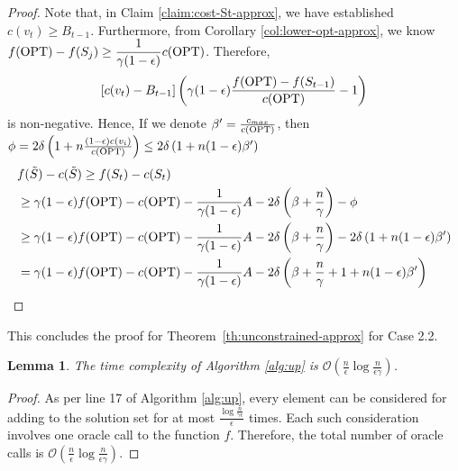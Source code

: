 \documentclass[10pt]{article} %
\newtheorem{lemma}[theorem]{Lemma}
\theoremstyle{remark}
\newcommand{\OPT}{{\rm OPT}}
\begin{document}
\begin{proof}
Note that, in Claim \ref{claim:cost-St-approx}, we have established $c(v_t)\geq B_{t-1}$. Furthermore, from Corollary \ref{col:lower-opt-approx}, we know
$f(\OPT) - f(S_j) \geq \displaystyle\frac{1}{\gamma(1-\epsilon)}{c(\OPT)}$. Therefore, 
\[
[c(v_t)-B_{t-1}]\left( \gamma(1-\epsilon) \displaystyle\frac{f(\OPT) - f(S_{t-1})}{c(\OPT)} -1 \right)
\]
is non-negative. Hence, 
If we denote $\beta' = \frac{c_{max}}{c(\OPT)}$, then $\phi = 2\delta  \left( 1+n\frac{(1-\epsilon)c(v_i)}{ c(\OPT)} \right) \leq 2\delta  \left( 1+n(1-\epsilon)\beta' \right)$
\begin{align*}
   &f(\Tilde{S})-c(\Tilde{S}) \geq f(S_t)-c(S_t)\\
   &\geq \gamma(1-\epsilon)f(\OPT)-c(\OPT)-\frac{1}{\gamma (1-\epsilon)}A - 2\delta\left(\beta+ \frac{n}{\gamma}\right)  - \phi\\
   &\geq \gamma(1-\epsilon)f(\OPT)-c(\OPT)-\frac{1}{\gamma (1-\epsilon)}A - 2\delta\left(\beta+ \frac{n}{\gamma}\right) - 2\delta  \left( 1+n(1-\epsilon)\beta' \right)\\
   &= \gamma(1-\epsilon)f(\OPT)-c(\OPT)-\frac{1}{\gamma (1-\epsilon)}A - 2\delta\left(\beta+ \frac{n}{\gamma} + 1 + n(1-\epsilon)\beta'\right)
\end{align*}

\end{proof}

This concludes the proof for Theorem~\ref{th:unconstrained-approx} for Case 2.2. 

\medskip
\begin{lemma}
    \label{lem:time-approx}
    The time complexity of Algorithm \ref{alg:up} is 
    $\mathcal{O}(\frac{n}{\epsilon} \log \frac{n}{\epsilon \gamma})$.
\end{lemma}
\begin{proof}
    As per line 17 of Algorithm \ref{alg:up}, every element can be considered for adding to the solution set for at most $\frac{\log \frac{n}{\gamma \epsilon}}{\epsilon}$ times. Each such consideration involves one oracle call to the function $f$. Therefore, the total number of oracle calls is $\mathcal{O}(\frac{n}{\epsilon} \log \frac{n}{\epsilon \gamma})$. 
\end{proof}





\end{document}
